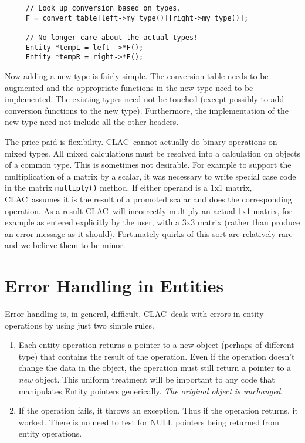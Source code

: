 \documentclass{report}
\newcommand{\CLAC}{CLAC}
\begin{document}
\begin{verbatim}
     // Look up conversion based on types.
     F = convert_table[left->my_type()][right->my_type()];

     // No longer care about the actual types!
     Entity *tempL = left ->*F();
     Entity *tempR = right->*F();
\end{verbatim}

Now adding a new type is fairly simple. The conversion table needs to be augmented and the appropriate functions in the new type need to be implemented. The existing types need not be touched (except possibly to add conversion functions to the new type). Furthermore, the implementation of the new type need not include all the other headers.

The price paid is flexibility. \CLAC\ cannot actually do binary operations on mixed types. All mixed calculations must be resolved into a calculation on objects of a common type. This is sometimes not desirable. For example to support the multiplication of a matrix by a scalar, it was necessary to write special case code in the matrix \texttt{multiply()} method. If either operand is a 1x1 matrix, \CLAC\ assumes it is the result of a promoted scalar and does the corresponding operation. As a result \CLAC\ will incorrectly multiply an actual 1x1 matrix, for example as entered explicitly by the user, with a 3x3 matrix (rather than produce an error message as it should). Fortunately quirks of this sort are relatively rare and we believe them to be minor.

\section{Error Handling in Entities}

Error handling is, in general, difficult. \CLAC\ deals with errors in entity operations by using just two simple rules.

\begin{enumerate}
  
\item Each entity operation returns a pointer to a new object (perhaps of different type) that contains the result of the operation. Even if the operation doesn't change the data in the object, the operation must still return a pointer to a \emph{new} object. This uniform treatment will be important to any code that manipulates Entity pointers generically. \emph{The original object} \emph{is unchanged}.
  
\item If the operation fails, it throws an exception. Thus if the operation returns, it worked. There is no need to test for NULL pointers being returned from entity operations.

\end{enumerate}
\end{document}

